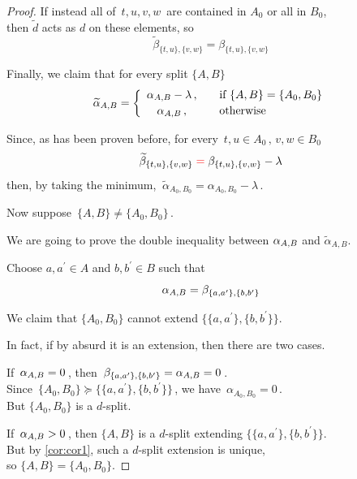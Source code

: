 \documentclass[./main.tex]{subfiles}
\begin{document}
\begin{proof}
    If instead all of $\, t,u,v,w \,$ are contained in $A_0$ or all in $B_0$, \\
    then $\widetilde{d}$ acts as $d$ on these elements, so
    \[ \widetilde{\beta}_{\{t,u\},\{v,w\}} = \beta_{\{t,u\},\{v,w\}} \]

    \hrulefill \clearpage

    Finally, we claim that for every split $\{A,B\}$
    \[ \widetilde{\alpha}_{A,B} = \bigg\{
        \begin{array}{cl}
            \alpha_{A,B} - \lambda \,,   & \quad \text{if}\ \{A,B\} = \{A_0,B_0\} \\[2pt]
            \alpha_{A,B} \,,             & \quad \text{otherwise}
        \end{array}
    \nospblw \] \bigskip

    Since, as has been proven before, for every $\, t,u \in A_0 \,,\, v,w \in B_0$
    \[ \widetilde{\beta}_{\{t,u\},\{v,w\}} \mathcolor{red}{=} \beta_{\{t,u\},\{v,w\}} - \lambda \]
    then, by taking the minimum, $\ \widetilde{\alpha}_{A_0,B_0} = \alpha_{A_0,B_0} - \lambda \,$. \bigskip \bigskip

    Now suppose $\, \{A,B\} \neq \{A_0,B_0\} \,$.

    We are going to prove the double inequality between $\alpha_{A,B}$ and $\widetilde{\alpha}_{A,B}$. \bigskip \medskip

    Choose $a,a^\prime \in A$ and $b,b^\prime \in B$ such that
    \[ \aAB = \beta_{\{a,a^\prime\},\{b,b^\prime\}} \nospblw \]

    We claim that $\{A_0,B_0\}$ cannot extend $\bigl\{ \{a,a^\prime\},\{b,b^\prime\} \bigr\}$. \medskip
    
    In fact, if by absurd it is an extension, then there are two cases.

    If $\, \alpha_{A,B} = 0 \,$, then $\, \beta_{\{a,a^\prime\},\{b,b^\prime\}} = \alpha_{A,B} = 0 \,$. \\[3pt]
    Since $\, \{A_0,B_0\} \succcurlyeq \bigl\{ \{a,a^\prime\},\{b,b^\prime\} \bigr\} \,$, we have $\, \alpha_{A_0,B_0} = 0 \,$. \\[2pt]
    But $\{A_0,B_0\}$ is a $d$-split. \absurd

    If $\, \alpha_{A,B} > 0 \,$, then $\{A,B\}$ is a $d$-split extending $\bigl\{ \{a,a^\prime\},\{b,b^\prime\} \bigr\}$. \\[2pt]
    But by \autoref{cor:cor1}, such a $d$-split extension is unique, \\[2pt]
    so $\{A,B\} = \{A_0,B_0\}$. \absurd \medskip


\end{proof}
\end{document}
